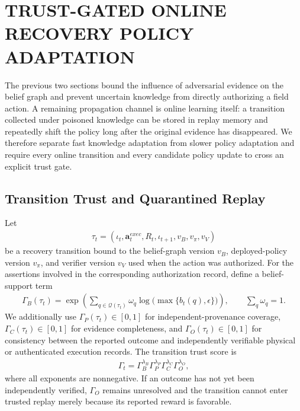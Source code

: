 \section{TRUST-GATED ONLINE RECOVERY POLICY ADAPTATION}
\label{sec-trust-policy}
The previous two sections bound the influence of adversarial evidence on the belief graph and prevent uncertain knowledge from directly authorizing a field action. A remaining propagation channel is online learning itself: a transition collected under poisoned knowledge can be stored in replay memory and repeatedly shift the policy long after the original evidence has disappeared. We therefore separate fast knowledge adaptation from slower policy adaptation and require every online transition and every candidate policy update to cross an explicit trust gate.

\subsection{Transition Trust and Quarantined Replay}
Let
\begin{align}
\label{eq-transition}
\tau_t=(\iota_t,\mathbf{a}^{exec}_t,R_t,\iota_{t+1},v_B,v_\pi,v_V)
\end{align}
be a recovery transition bound to the belief-graph version $v_B$, deployed-policy version $v_\pi$, and verifier version $v_V$ used when the action was authorized. For the assertions involved in the corresponding authorization record, define a belief-support term
\begin{align}
\label{eq-transition-belief-trust}
\Gamma_B(\tau_t)=
\exp\left(
\sum_{q\in\mathcal{Q}(\tau_t)}\omega_q
\log\big(\max\{b_t(q),\epsilon\}\big)
\right),
\qquad \sum_q\omega_q=1.
\end{align}
We additionally use $\Gamma_P(\tau_t)\in[0,1]$ for independent-provenance coverage, $\Gamma_C(\tau_t)\in[0,1]$ for evidence completeness, and $\Gamma_O(\tau_t)\in[0,1]$ for consistency between the reported outcome and independently verifiable physical or authenticated execution records. The transition trust score is
\begin{align}
\label{eq-transition-trust}
\Gamma_t=
\Gamma_B^{\lambda_B}
\Gamma_P^{\lambda_P}
\Gamma_C^{\lambda_C}
\Gamma_O^{\lambda_O},
\end{align}
where all exponents are nonnegative. If an outcome has not yet been independently verified, $\Gamma_O$ remains unresolved and the transition cannot enter trusted replay merely because its reported reward is favorable.

